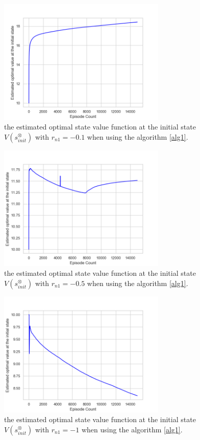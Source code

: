 \documentclass[letterpaper, 10 pt, conference, dvipdfmx]{ieeeconf}
\begin{document}
\begin{figure}[htbp]
   \centering
   \vspace{2mm}
   \includegraphics[width = 8cm]{max_Q_value_TD.png}
   \caption{the estimated optimal state value function at the initial state $V(s^{\otimes}_{init})$ with $r_{n1} = -0.1$ when using the algorithm \ref{alg1}.}
   \label{result1}
\end{figure}

\begin{figure}[htbp]
   \centering
   \vspace{2mm}
   \includegraphics[width = 8cm]{learning_TD_v_15000_5000_rn2_05.png}
   \caption{the estimated optimal state value function at the initial state $V(s^{\otimes}_{init})$ with $r_{n1} = -0.5$ when using the algorithm \ref{alg1}.}
   \label{result2}
\end{figure}

\begin{figure}[htbp]
   \centering
   \vspace{2mm}
   \includegraphics[width = 8cm]{max_Q_value_TD_rn2_1.png}
   \caption{the estimated optimal state value function at the initial state $V(s^{\otimes}_{init})$ with $r_{n1} = -1$ when using the algorithm \ref{alg1}.}
   \label{result3}
\end{figure}
\end{document}
